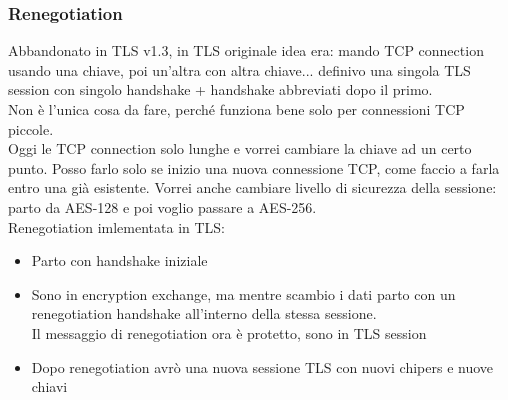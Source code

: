 \documentclass[16px]{article}
\begin{document}
\subsubsection{Renegotiation}
Abbandonato in TLS v1.3, in TLS originale idea era: mando TCP connection usando una chiave, poi un'altra con altra chiave... definivo una singola TLS session con singolo handshake + handshake abbreviati dopo il primo.\\ Non è l'unica cosa da fare, perché funziona bene solo per connessioni TCP piccole.\\ Oggi le TCP connection solo lunghe e vorrei cambiare la chiave ad un certo punto. Posso farlo solo se inizio una nuova connessione TCP, come faccio a farla entro una già esistente. Vorrei anche cambiare livello di sicurezza della sessione: parto da AES-128 e poi voglio passare a AES-256.\\ Renegotiation imlementata in TLS:
\begin{itemize}
\item Parto con handshake iniziale
\item Sono in encryption exchange, ma mentre scambio i dati parto con un renegotiation handshake all'interno della stessa sessione.\\ Il messaggio di renegotiation ora è protetto, sono in TLS session
\item Dopo renegotiation avrò una nuova sessione TLS con nuovi chipers e nuove chiavi
\end{itemize}
\end{document}
